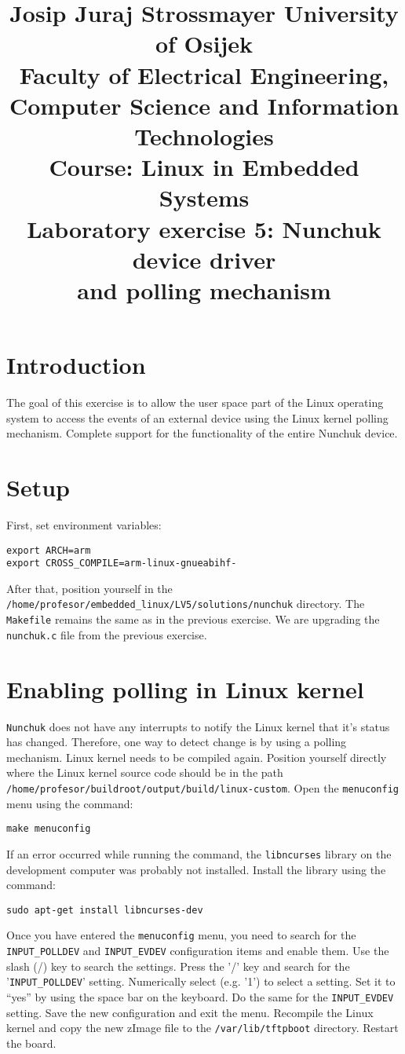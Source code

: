 \documentclass[11pt]{article}
\title{
	\Large Josip Juraj Strossmayer University of Osijek \\
	Faculty of Electrical Engineering, Computer Science and Information
	 Technologies\\
	\vspace{4cm}
	\Large Course: Linux in Embedded Systems \\
	\vspace{4cm}
	\Large \textbf{Laboratory exercise 5: Nunchuk device driver\\
					and polling mechanism}
	}
\date{}
\begin{document}
\maketitle
\thispagestyle{empty}
\newpage

\section{Introduction}
The goal of this exercise is to allow the user space part of the Linux
operating system to access the events of an external device using the Linux
kernel polling mechanism. Complete support for the functionality of the entire
Nunchuk device.

\section{Setup}
First, set environment variables:
\begin{lstlisting}
export ARCH=arm
export CROSS_COMPILE=arm-linux-gnueabihf-
\end{lstlisting}
After that, position yourself in the \texttt{/home/profesor/embedded\_linux/LV5/solutions/nunchuk}
directory.
The \texttt{Makefile} remains the same as in the previous exercise. We are
upgrading the \texttt{nunchuk.c} file from the previous exercise.

\section{Enabling polling in Linux kernel}
\texttt{Nunchuk} does not have any interrupts to notify the Linux kernel that
 it's status has changed. Therefore, one way to detect change is by using a
 polling mechanism.
\newline
\newline
Linux kernel needs to be compiled again. Position yourself directly
where the Linux kernel source code should be in the path
 \texttt{/home/profesor/buildroot/output/build/linux-custom}. Open the
 \texttt{menuconfig} menu using the command:
\begin{lstlisting}
make menuconfig
\end{lstlisting}
If an error occurred while running the command, the \texttt{libncurses} library
 on the development computer was probably not installed. Install the library
 using the command:
\begin{lstlisting}
sudo apt-get install libncurses-dev
\end{lstlisting}
Once you have entered the \texttt{menuconfig} menu, you need to search for the
\texttt{INPUT\_POLLDEV} and \texttt{INPUT\_EVDEV} configuration items and enable
them. Use the slash (/) key to search the settings. Press the '/' key and search
for the '\texttt{INPUT\_POLLDEV}' setting. Numerically select (e.g. '1') to
 select a setting. Set it to “yes” by using the space bar on the keyboard. Do
 the same for the \texttt{INPUT\_EVDEV} setting. Save the new configuration and
 exit the menu. Recompile the Linux kernel and copy the new zImage file to the
 \texttt{/var/lib/tftpboot} directory. Restart the board.
\end{document}
